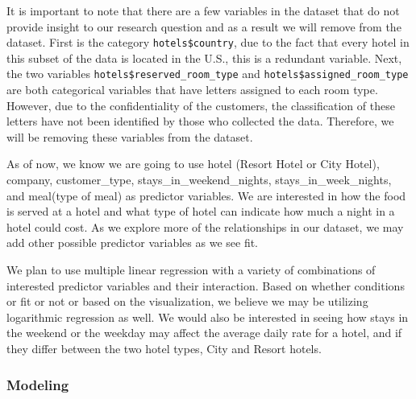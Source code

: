 \documentclass[
]{article}
\newenvironment{Shaded}{\begin{snugshade}}{\end{snugshade}}
\newcommand{\ConstantTok}[1]{\textcolor[rgb]{0.00,0.00,0.00}{#1}}
\newcommand{\NormalTok}[1]{#1}
\newcommand{\OtherTok}[1]{\textcolor[rgb]{0.56,0.35,0.01}{#1}}
\newcommand{\SpecialCharTok}[1]{\textcolor[rgb]{0.00,0.00,0.00}{#1}}
\begin{document}
It is important to note that there are a few variables in the dataset
that do not provide insight to our research question and as a result we
will remove from the dataset. First is the category
\texttt{hotels\$country}, due to the fact that every hotel in this
subset of the data is located in the U.S., this is a redundant variable.
Next, the two variables \texttt{hotels\$reserved\_room\_type} and
\texttt{hotels\$assigned\_room\_type} are both categorical variables
that have letters assigned to each room type. However, due to the
confidentiality of the customers, the classification of these letters
have not been identified by those who collected the data. Therefore, we
will be removing these variables from the dataset.

\begin{Shaded}
\end{Shaded}

As of now, we know we are going to use hotel (Resort Hotel or City
Hotel), company, customer\_type, stays\_in\_weekend\_nights,
stays\_in\_week\_nights, and meal(type of meal) as predictor variables.
We are interested in how the food is served at a hotel and what type of
hotel can indicate how much a night in a hotel could cost. As we explore
more of the relationships in our dataset, we may add other possible
predictor variables as we see fit.

We plan to use multiple linear regression with a variety of combinations
of interested predictor variables and their interaction. Based on
whether conditions or fit or not or based on the visualization, we
believe we may be utilizing logarithmic regression as well. We would
also be interested in seeing how stays in the weekend or the weekday may
affect the average daily rate for a hotel, and if they differ between
the two hotel types, City and Resort hotels.

\hypertarget{modeling}{%
\subsubsection{Modeling}\label{modeling}}
\end{document}
